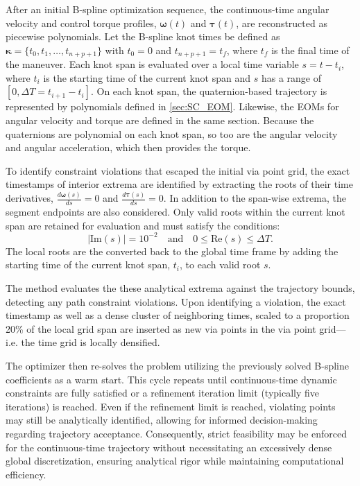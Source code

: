 After an initial B-spline optimization sequence, the continuous-time angular velocity and control torque profiles, $\boldsymbol{\omega}(t)$ and $\boldsymbol{\tau}(t)$, are reconstructed as piecewise polynomials. 
Let the B-spline knot times be defined as $\boldsymbol{\kappa} = \{t_0, t_1, \dots, t_{n+p+1}\}$ with $t_0 = 0$ and $t_{n+p+1} = t_f$, where $t_f$ is the final time of the maneuver.
Each knot span is evaluated over a local time variable $s = t - t_i$, where $t_i$ is the starting time of the current knot span and $s$ has a range of $[0, \Delta T = t_{i+1} - t_i]$.
On each knot span, the quaternion-based trajectory is represented by polynomials defined in \cref{sec:SC_EOM}.
Likewise, the \ac{EOM}s for angular velocity and torque are defined in the same section.
Because the quaternions are polynomial on each knot span, so too are the angular velocity and angular acceleration, which then provides the torque. 

To identify constraint violations that escaped the initial via point grid, the exact timestamps of interior extrema are identified by extracting the roots of their time derivatives, $\frac{d\boldsymbol{\omega}(s)}{ds} = 0$ and $\frac{d{\boldsymbol{\tau}}(s)}{ds} = 0$. 
In addition to the span-wise extrema, the segment endpoints are also considered. Only valid roots within the current knot span are retained for evaluation and must satisfy the conditions:
\begin{equation}
	|\text{Im}(s)| = 10^{-2} \quad \text{and} \quad 0 \leq \text{Re}(s) \leq \Delta T.
\end{equation}
The local roots are the converted back to the global time frame by adding the starting time of the current knot span, $t_i$, to each valid root $s$.

The method evaluates the these analytical extrema against the trajectory bounds, detecting any path constraint violations.
Upon identifying a violation, the exact timestamp as well as a dense cluster of neighboring times, scaled to a proportion 20\% of the local grid span are inserted as new via points in the via point grid---
i.e. the time grid is locally densified. 

The optimizer then re-solves the problem utilizing the previously solved B-spline coefficients as a warm start. 
This cycle repeats until continuous-time dynamic constraints are fully satisfied or a refinement iteration limit (typically five iterations) is reached. 
Even if the refinement limit is reached, violating points may still be analytically identified, allowing for informed decision-making regarding trajectory acceptance.
Consequently, strict feasibility may be enforced for the continuous-time trajectory without necessitating an excessively dense global discretization, ensuring analytical rigor while maintaining computational efficiency.


